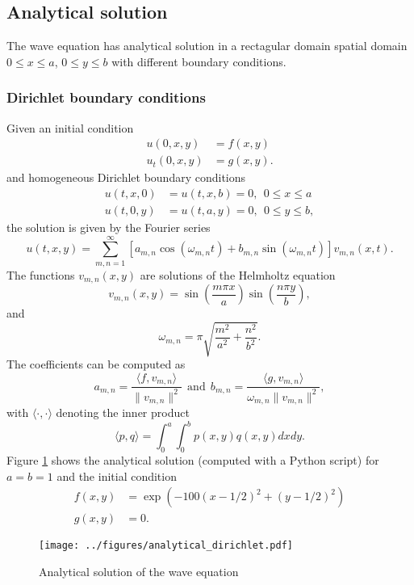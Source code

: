 \documentclass[11pt]{article}
\begin{document}
\subsection{Analytical solution}
The wave equation has analytical solution in a rectagular domain spatial domain $0 \le x \le a$, $0 \le y \le b$ with different boundary conditions.

\subsubsection{Dirichlet boundary conditions}
Given an initial condition
\begin{align}
  u(0,x,y) &= f(x,y) \\
  u_t(0,x,y) &= g(x,y).
\end{align}
and homogeneous Dirichlet boundary conditions
\begin{align}
  \label{eq:7}
  u(t,x,0) &= u(t,x,b) = 0,~~0 \le x \le a \\
  u(t,0,y) &= u(t,a,y) = 0,~~0 \le y \le b,
\end{align}
the solution is given by the Fourier series \cite{olver2014introduction}
\begin{equation}
  \label{eq:8}
  u(t,x,y) = \sum_{m,n=1}^\infty\left[a_{m,n}\cos(\omega_{m,n}t) + b_{m,n}\sin(\omega_{m,n}t)\right]v_{m,n}(x,t).
\end{equation}
The functions $v_{m,n}(x,y)$ are solutions of the Helmholtz equation
\begin{equation}
  \label{eq:10}
  v_{m,n}(x,y) = \sin\left(\frac{m\pi x}{a}\right)\sin\left(\frac{n\pi y}{b}\right),
\end{equation}
and
\begin{equation}
  \label{eq:12}
  \omega_{m,n} = \pi\sqrt{\frac{m^2}{a^2} + \frac{n^2}{b^2}}.
\end{equation}
The coefficients can be computed as
\begin{equation}
  \label{eq:9}
  a_{m,n} = \frac{\langle f, v_{m,n}\rangle}{\|v_{m,n}\|^2}~~\mathrm{and}~~
  b_{m,n} = \frac{\langle g, v_{m,n}\rangle}{\omega_{m,n}\|v_{m,n}\|^2},
\end{equation}
with $\langle \cdot, \cdot \rangle$ denoting the inner product
\begin{equation}
  \label{eq:11}
  \langle p,q \rangle = \int_0^a\int_0^b p(x,y)q(x,y) dx dy.
\end{equation}
Figure \ref{fig:dirich} shows the analytical solution (computed with a Python script) for $ a = b = 1$ and the initial condition
\begin{align}
  f(x,y) &= \exp\left(-100(x-1/2)^2 + (y-1/2)^2\right)\\
  g(x,y) &= 0.     
\end{align}
\begin{figure}[h]
  \centering
    \texttt{[image: ../figures/analytical\_dirichlet.pdf]} 
  \caption{\label{fig:dirich} Analytical solution of the wave equation}
\end{figure}
\end{document}
